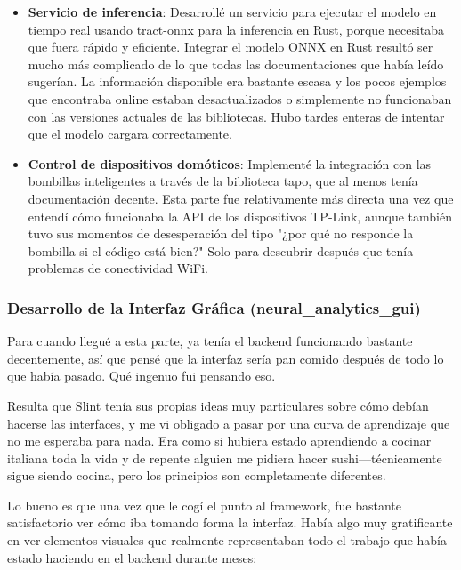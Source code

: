 \begin{itemize}
    \item \textbf{Servicio de inferencia}: Desarrollé un servicio para ejecutar el modelo en tiempo real usando tract-onnx para la inferencia en Rust, porque necesitaba que fuera rápido y eficiente. Integrar el modelo ONNX en Rust resultó ser mucho más complicado de lo que todas las documentaciones que había leído sugerían. La información disponible era bastante escasa y los pocos ejemplos que encontraba online estaban desactualizados o simplemente no funcionaban con las versiones actuales de las bibliotecas. Hubo tardes enteras de intentar que el modelo cargara correctamente.
    
    \item \textbf{Control de dispositivos domóticos}: Implementé la integración con las bombillas inteligentes a través de la biblioteca tapo, que al menos tenía documentación decente. Esta parte fue relativamente más directa una vez que entendí cómo funcionaba la API de los dispositivos TP-Link, aunque también tuvo sus momentos de desesperación del tipo "¿por qué no responde la bombilla si el código está bien?" Solo para descubrir después que tenía problemas de conectividad WiFi.
\end{itemize}

\subsubsection{Desarrollo de la Interfaz Gráfica (neural\_analytics\_gui)}

Para cuando llegué a esta parte, ya tenía el backend funcionando bastante decentemente, así que pensé que la interfaz sería pan comido después de todo lo que había pasado. Qué ingenuo fui pensando eso.

Resulta que Slint tenía sus propias ideas muy particulares sobre cómo debían hacerse las interfaces, y me vi obligado a pasar por una curva de aprendizaje que no me esperaba para nada. Era como si hubiera estado aprendiendo a cocinar italiana toda la vida y de repente alguien me pidiera hacer sushi—técnicamente sigue siendo cocina, pero los principios son completamente diferentes.

Lo bueno es que una vez que le cogí el punto al framework, fue bastante satisfactorio ver cómo iba tomando forma la interfaz. Había algo muy gratificante en ver elementos visuales que realmente representaban todo el trabajo que había estado haciendo en el backend durante meses:

